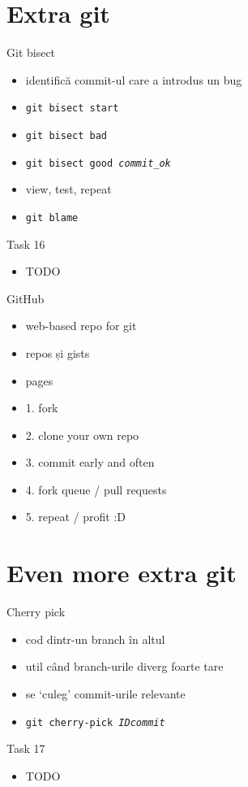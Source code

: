 \documentclass{beamer}
\begin{document}
\section{Extra git}

\begin{frame}{Git bisect}
  \begin{itemize}
    \item identifică commit-ul care a introdus un bug
    \item \texttt{git bisect start}
    \item \texttt{git bisect bad}
    \item \texttt{git bisect good \textit{commit\_ok}}
    \item view, test, repeat
    \pause
    \item \texttt{git blame}
  \end{itemize}
  \pause
  \begin{alertblock}{Task 16}
    \begin{itemize}
      \item TODO
    \end{itemize}
  \end{alertblock}
\end{frame}

\begin{frame}{GitHub}
  \begin{itemize}
    \item web-based repo for git
    \item repos și gists
    \item pages
    \pause
    \item 1. fork
    \item 2. clone your own repo
    \item 3. commit early and often
    \item 4. fork queue / pull requests
    \item 5. repeat / profit :D
  \end{itemize}
\end{frame}

\section{Even more extra git}

\begin{frame}{Cherry pick}
  \begin{itemize}
    \item cod dintr-un branch în altul
    \item util când branch-urile diverg foarte tare
    \item se `culeg' commit-urile relevante
    \item \texttt{git cherry-pick \textit{IDcommit}}
  \end{itemize}
  \pause
  \begin{alertblock}{Task 17}
    \begin{itemize}
      \item TODO
    \end{itemize}
  \end{alertblock}
\end{frame}


\end{document}

